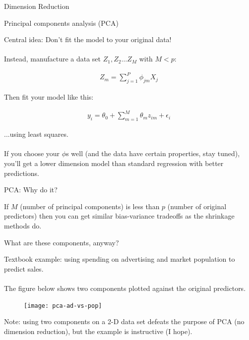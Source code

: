 \documentclass[mathserif]{beamer}
\begin{document}
\begin{frame}
\begin{center}

\Large Dimension Reduction
\end{center}
\end{frame}


\begin{frame}{Principal components analysis (PCA)}

Central idea:  Don't fit the model to your original data!\\~\\

Instead, manufacture a data set $Z_1, Z_2\dots Z_M$ with $M<p$:

\begin{align*}
Z_m= \sum_{j=1}^P \phi_{jm}X_j
\end{align*}

Then fit your model like this:

\begin{align*}
y_i = \theta_0 + \sum_{m=1}^M\theta_{m}z_{im}+\epsilon_i
\end{align*}

...using least squares.\\~\\

If you choose your $\phi$s well (and the data have certain properties, stay tuned), you'll get a lower dimension model than standard regression with better predictions.  
\end{frame}

\begin{frame}{PCA: Why do it?}

\pause

If $M$ (number of principal components) is less than $p$ (number of original predictors) then you can get similar bias-variance tradeoffs as the shrinkage methods do.  
\end{frame}

\begin{frame}{What are these components, anyway?}

Textbook example: using spending on advertising and market population to predict sales.  \\~\\

The figure below shows two components plotted against the original predictors.  

\begin{figure}
\texttt{[image: pca-ad-vs-pop]}
\end{figure}

Note: using two components on a 2-D data set defeats the purpose of PCA (no dimension reduction), but the example is instructive (I hope).
\end{frame}
\end{document}
